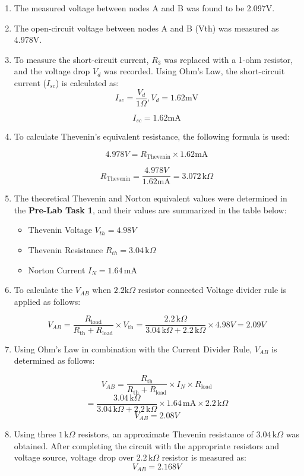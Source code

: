 \documentclass{article}
\begin{document}
\begin{enumerate}
  \item The measured voltage between nodes A and B was found to be 2.097V.

  \item The open-circuit voltage between nodes A and B (Vth) was measured as 4.978V.

  \item To measure the short-circuit current, \( R_3 \) was replaced with a 1-ohm resistor, and the voltage drop \( V_d \) was recorded. Using Ohm's Law, the short-circuit current (\( I_{sc} \)) is calculated as:
  \[
  I_{sc} = \frac{V_d}{1 \Omega} ,  V_d = 1.62 \text{mV}
  \]


  \[
  I_{sc} = 1.62 \text{mA}
  \]

  \item To calculate Thevenin's equivalent resistance, the following formula is used:

  \[
  4.978V = R_{\text{Thevenin}} \times 1.62 \text{mA}
  \]
  
  \[
  R_{\text{Thevenin}} = \frac{4.978V}{1.62 \text{mA}} = 3.072 \, \text{k}\Omega
  \]

  \item The theoretical Thevenin and Norton equivalent values were determined in the \textbf{Pre-Lab Task 1}, and their values are summarized in the table below:
  
  \begin{itemize}
    \item Thevenin Voltage \( V_{th} = 4.98V \)
    \item Thevenin Resistance \( R_{th} = 3.04 \, \text{k}\Omega \)
    \item Norton Current \( I_N = 1.64 \, \text{mA} \)
  \end{itemize}

  \item To calculate the \( V_{{AB}} \) when \( 2.2 \text{k} \Omega\) resistor connected Voltage divider rule is applied as follows:

  \[
  V_{AB} = \frac{R_{\text{load}}}{R_{\text{th}} + R_{\text{load}}} \times V_{\text{th}} = \frac{2.2 \, \text{k}\Omega}{3.04 \, \text{k}\Omega + 2.2 \, \text{k}\Omega} \times 4.98V = 2.09V
  \]

  \item Using Ohm's Law in combination with the Current Divider Rule, \( V_{AB} \) is determined as follows:

  \[
  V_{AB} = \frac{R_{\text{th}}}{R_{\text{th}} + R_{\text{load}}} \times I_N \times R_{\text{load}}
  \]
  \[
   = \frac{3.04 \, \text{k}\Omega}{3.04 \, \text{k}\Omega + 2.2 \, \text{k}\Omega} \times 1.64 \, \text{mA} \times 2.2 \, \text{k}\Omega
  \]
  \[
  V_{AB} = 2.08V
  \]

  \item Using three \(1 \, \text{k}\Omega\) resistors, an approximate Thevenin resistance of \(3.04 \, \text{k}\Omega\) was obtained. After completing the circuit with the appropriate resistors and voltage source, voltage drop over \(2.2 \, \text{k}\Omega\)  resistor is measured as:
  \[
    V_{AB} = 2.168V
  \]

\end{enumerate}
\end{document}
